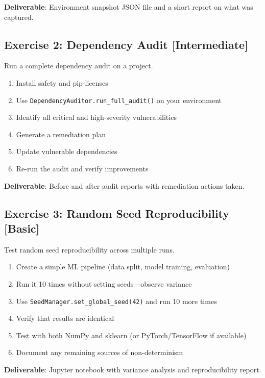 \textbf{Deliverable}: Environment snapshot JSON file and a short report on what was captured.

\subsection{Exercise 2: Dependency Audit [Intermediate]}

Run a complete dependency audit on a project.

\begin{enumerate}
    \item Install safety and pip-licenses
    \item Use \texttt{DependencyAuditor.run\_full\_audit()} on your environment
    \item Identify all critical and high-severity vulnerabilities
    \item Generate a remediation plan
    \item Update vulnerable dependencies
    \item Re-run the audit and verify improvements
\end{enumerate}

\textbf{Deliverable}: Before and after audit reports with remediation actions taken.

\subsection{Exercise 3: Random Seed Reproducibility [Basic]}

Test random seed reproducibility across multiple runs.

\begin{enumerate}
    \item Create a simple ML pipeline (data split, model training, evaluation)
    \item Run it 10 times without setting seeds---observe variance
    \item Use \texttt{SeedManager.set\_global\_seed(42)} and run 10 more times
    \item Verify that results are identical
    \item Test with both NumPy and sklearn (or PyTorch/TensorFlow if available)
    \item Document any remaining sources of non-determinism
\end{enumerate}

\textbf{Deliverable}: Jupyter notebook with variance analysis and reproducibility report.


